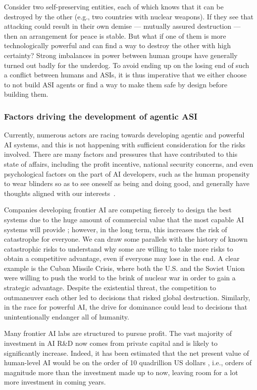 Consider two self-preserving entities, each of which knows that it can be destroyed by the other (e.g., two countries with nuclear weapons). If they see that attacking could result in their own demise --- mutually assured destruction --- then an arrangement for peace is stable. But what if one of them is more technologically powerful and can find a way to destroy the other with high certainty? Strong imbalances in power between human groups have generally turned out badly for the underdog. To avoid ending up on the losing end of such a conflict between humans and ASIs, it is thus imperative that we either choose to not build ASI agents or find a way to make them safe by design before building them.


\subsubsection{Factors driving the development of agentic ASI}
    
Currently, numerous actors are racing towards developing agentic and powerful AI systems, and this is not happening with sufficient consideration for the risks involved. There are many factors and pressures that have contributed to this state of affairs, including the profit incentive, national security concerns, and even psychological factors on the part of AI developers, such as the human propensity to wear blinders so as to see oneself as being and doing good, and generally have thoughts aligned with our interests~\cite{kunda1990case}.

Companies developing frontier AI are competing fiercely to design the best systems due to the huge amount of commercial value that the most capable AI systems will provide \cite{www.amacad.org.publication.daedalus.if.we.succeed}; however, in the long term, this increases the risk of catastrophe for everyone. We can draw some parallels with the history of known catastrophic risks to understand why some are willing to take more risks to obtain a competitive advantage, even if everyone may lose in the end. A clear example is the Cuban Missile Crisis, where both the U.S. and the Soviet Union were willing to push the world to the brink of nuclear war in order to gain a strategic advantage. Despite the existential threat, the competition to outmaneuver each other led to decisions that risked global destruction. Similarly, in the race for powerful AI, the drive for dominance could lead to decisions that unintentionally endanger all of humanity.

Many frontier AI labs are structured to pursue profit. The vast majority of investment in AI R\&D now comes from private capital \cite{aiindex.stanford.edu.wp.content.uploads.2024.04.HAI.2024.AI.Index.Report.pdf} and is likely to significantly increase. Indeed, it has been estimated that the net present value of human-level AI would be on the order of 10 quadrillion US dollars \cite{www.amacad.org.publication.daedalus.if.we.succeed}, i.e., orders of magnitude more than the investment made up to now, leaving room for a lot more investment in coming years.

